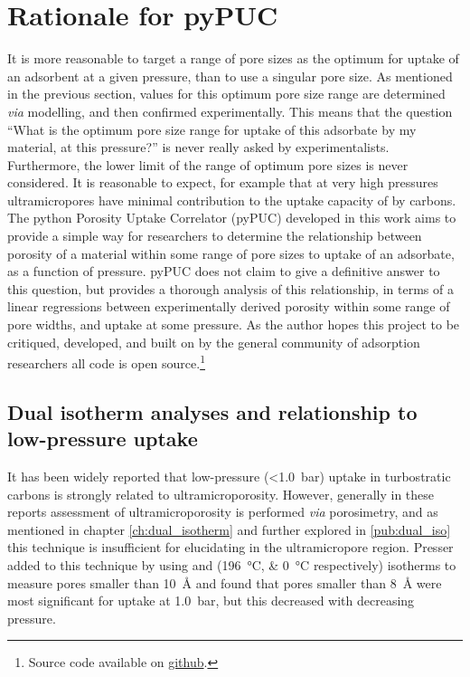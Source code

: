 \section{Rationale for pyPUC}
It is more reasonable to target a range of pore sizes as the optimum for uptake of an \gls{adsorbent} at a given pressure, than to use a singular pore size. As mentioned in the previous section, values for this optimum pore size range are determined \textit{via} modelling, and then confirmed experimentally.\citep{Biloe2002Optimal, Cabria2007optimum, Hlushak2018Heat, Choi2019Unique, Presser2011Effect} This means that the question ``What is the optimum pore size range for uptake of this \gls{adsorbate} by my material, at this pressure?'' is never really asked by experimentalists. Furthermore, the lower limit of the range of optimum pore sizes is never considered. It is reasonable to expect, for example that at very high pressures \glspl{ultramicropore} have minimal contribution to the uptake capacity of  by carbons. The python Porosity Uptake Correlator (pyPUC) developed in this work aims to provide a simple way for researchers to determine the relationship between porosity of a material within some range of pore sizes to uptake of an \gls{adsorbate}, as a function of pressure. pyPUC does not claim to give a definitive answer to this question, but provides a thorough analysis of this relationship, in terms of a linear regressions between experimentally derived porosity within some range of pore widths, and uptake at some pressure. As the author hopes this project to be critiqued, developed, and built on by the general community of \gls{adsorption} researchers all code is open source.\footnote{Source code available on \href{https://github.com/sblanky/pyPUC}{github}.}

\subsection[]{\texorpdfstring{Dual isotherm analyses and relationship to low-pressure  uptake}{Dual isotherm analyses and relationship to low-pressure CO2 uptake}}
It has been widely reported that low-pressure (\qty{<1.0}{\bar})  uptake in \glspl{turbostratic carbon} is strongly related to ultramicroporosity.\citep{Presser2011Effect, Sevilla2013Assessment, Adeniran2016Is, Wickramaratne2013Importance} However, generally in these reports assessment of ultramicroporosity is performed \textit{via}  porosimetry, and as mentioned in chapter \ref{ch:dual_isotherm} and further explored in \ref{pub:dual_iso} this technique is insufficient for elucidating  in the \gls{ultramicropore} region.\citep{Jagiello2008Characterization, Jagiello2019Enhanced, Jagiello2020Exploiting} Presser added to this technique by using  and  (\qtylist[list-units=single]{196;0}{\degreeCelsius} respectively) isotherms to measure pores smaller than \qty{10}{\angstrom} and found that pores smaller than \qty{8}{\angstrom} were most significant for  uptake at \qty{1.0}{\bar}, but this decreased with decreasing pressure.\citep{Presser2011Effect}

